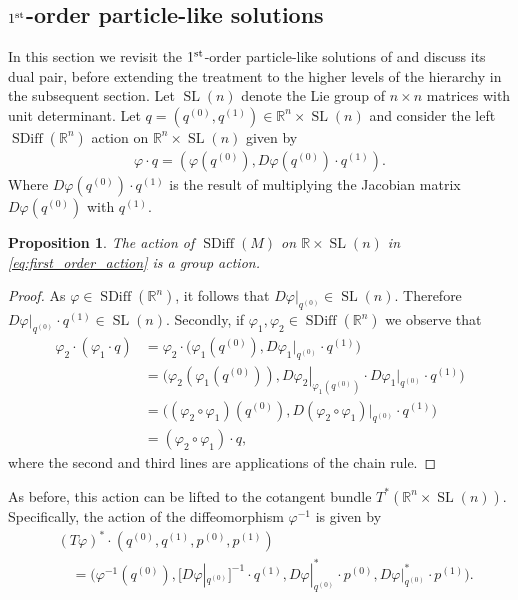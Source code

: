 \documentclass[12pt]{amsart}
\newcommand{\R}{\ensuremath{\mathbb{R}}}
\newtheorem{prop}[thm]{Proposition}
\DeclareMathOperator{\SDiff}{SDiff}
\DeclareMathOperator{\SL}{SL}
\begin{document}
\subsection{$1^{\rm st}$-order particle-like solutions}
\label{sec:first_order}
In this section we revisit the $1^{\rm st}$-order particle-like solutions of \cite{CotterHolmJacobsMeier2014} and discuss its dual pair, before extending the treatment to the higher levels of the hierarchy in the subsequent section. 
  Let $\SL(n)$ denote the Lie group of $n\times n$ matrices
  with unit determinant.
  Let $q = (q^{(0)}, q^{(1)}) \in \R^n \times \SL(n)$ and consider the left
  $\SDiff(\R^n)$ action on $\R^n \times \SL(n)$ given by
  \begin{align}
    \varphi \cdot q = (\varphi(q^{(0)} ) , D\varphi(q^{(0)} ) \cdot q^{(1)} ). \label{eq:first_order_action}
  \end{align}
  Where $D\varphi(q^{(0)} ) \cdot q^{(1)}$ is the result of multiplying
  the Jacobian matrix $D\varphi(q^{(0)} )$ with $q^{(1)}$.
  \begin{prop}
    The action of $\SDiff(M)$ on $\R \times \SL(n)$ in \eqref{eq:first_order_action} is a group action.
  \end{prop}
  \begin{proof}
    As $\varphi \in \SDiff(\R^n)$, it follows that $D\varphi |_{q^{(0)}} \in \SL(n)$.
    Therefore $D\varphi |_{q^{(0)}} \cdot q^{(1)} \in \SL(n)$.
    Secondly, if $\varphi_1,\varphi_2 \in \SDiff(\R^n)$ we observe that
    \begin{align*}
      \varphi_2 \cdot (\varphi_1 \cdot q)
      &= \varphi_2 \cdot \big(\varphi_1(q^{(0)} ) , D\varphi_1 |_{q^{(0)}} \cdot q^{(1)} \big) \\
      &= \big(\varphi_2(\varphi_1(q^{(0)} )) , \left. D\varphi_2 \right|_{\varphi_1( q^{(0)} )} \cdot D\varphi_1 |_{ q^{(0)} } \cdot q^{(1)} \big) \\
      &= \big( (\varphi_2 \circ \varphi_1)(q^{(0)} ) , D( \varphi_2 \circ \varphi_1)|_{q^{(0)} } \cdot q^{(1)} \big) \\
      &= (\varphi_2 \circ \varphi_1) \cdot q,
    \end{align*}
    where the second and third lines are applications of the chain rule.
  \end{proof}
  As before, this action can be lifted to the cotangent bundle $T^*(\R^n \times \SL(n))$.  Specifically, 
  the action of the diffeomorphism $\varphi^{-1}$ is given by
  \begin{align*}
    & (T\varphi)^* \cdot ( q^{(0)} , q^{(1)}  , p^{(0)} , p^{(1)} ) \\
    &\quad = \big( \varphi^{-1}(q^{(0)})  , [D\varphi|_{q^{(0)}}]^{-1} \cdot q^{(1)} , D\varphi|_{q^{(0)}}^* \cdot p^{(0)} , D\varphi|_{q^{(0)}}^* \cdot p^{(1)} \big).
  \end{align*}
\end{document}
